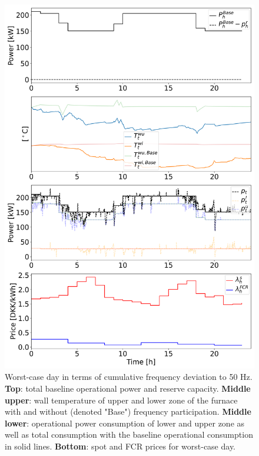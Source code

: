 \documentclass[sigconf]{acmart}
\begin{document}
\begin{figure}[t]
    \centering
    \includegraphics[width=\columnwidth]{figures/fcr_single_case.png}
    \caption{Worst-case day in terms of cumulative frequency deviation to 50 Hz. \textbf{Top}: total baseline operational power and reserve capacity. \textbf{Middle upper}: wall temperature of upper and lower zone of the furnace with and without (denoted "Base") frequency participation. \textbf{Middle lower}: operational power consumption of lower and upper zone as well as total consumption with the baseline operational consumption in solid lines. \textbf{Bottom}: spot and FCR prices for worst-case day.}
    \label{fig:fcr_single_case}
\end{figure}
\end{document}
